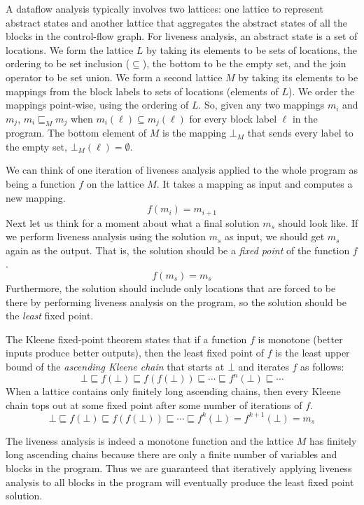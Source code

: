 \documentclass[7x10]{TimesAPriori_MIT}%
\numberwithin{theorem}{chapter}
\numberwithin{definition}{chapter}
\numberwithin{equation}{chapter}
\begin{document}
A dataflow analysis typically involves two lattices: one lattice to
represent abstract states and another lattice that aggregates the
abstract states of all the blocks in the control-flow graph.  For
liveness analysis, an abstract state is a set of locations.  We form
the lattice $L$ by taking its elements to be sets of locations, the
ordering to be set inclusion ($\subseteq$), the bottom to be the empty
set, and the join operator to be set union.
%
We form a second lattice $M$ by taking its elements to be mappings
from the block labels to sets of locations (elements of $L$).  We
order the mappings point-wise, using the ordering of $L$. So, given any
two mappings $m_i$ and $m_j$, $m_i \sqsubseteq_M m_j$ when $m_i(\ell)
\subseteq m_j(\ell)$ for every block label $\ell$ in the program.  The
bottom element of $M$ is the mapping $\bot_M$ that sends every label
to the empty set, $\bot_M(\ell) = \emptyset$.

We can think of one iteration of liveness analysis applied to the
whole program as being a function $f$ on the lattice $M$. It takes a
mapping as input and computes a new mapping.
\[
   f(m_i) = m_{i+1}
\]
Next let us think for a moment about what a final solution $m_s$
should look like. If we perform liveness analysis using the solution
$m_s$ as input, we should get $m_s$ again as the output. That is, the
solution should be a \emph{fixed point} of the function $f$.
\[
   f(m_s) = m_s
\]
Furthermore, the solution should include only locations that are
forced to be there by performing liveness analysis on the program, so
the solution should be the \emph{least} fixed point.

The Kleene fixed-point theorem states that if a function $f$ is
monotone (better inputs produce better outputs), then the least fixed
point of $f$ is the least upper bound of the \emph{ascending Kleene
  chain} that starts at $\bot$ and iterates $f$ as
follows:
\[
\bot \sqsubseteq f(\bot) \sqsubseteq f(f(\bot)) \sqsubseteq \cdots
  \sqsubseteq f^n(\bot) \sqsubseteq \cdots
\]
When a lattice contains only finitely long ascending chains, then
every Kleene chain tops out at some fixed point after some number of
iterations of $f$.
\[
\bot \sqsubseteq f(\bot) \sqsubseteq f(f(\bot)) \sqsubseteq \cdots
\sqsubseteq f^k(\bot) = f^{k+1}(\bot) = m_s
\]

The liveness analysis is indeed a monotone function and the lattice
$M$ has finitely long ascending chains because there are only a
finite number of variables and blocks in the program. Thus we are
guaranteed that iteratively applying liveness analysis to all blocks
in the program will eventually produce the least fixed point solution.
\end{document}
